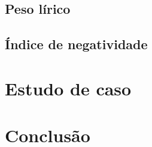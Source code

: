 \subsection{Peso lírico}



\subsection{Índice de negatividade}

\section{Estudo de caso}



\section{Conclusão}

